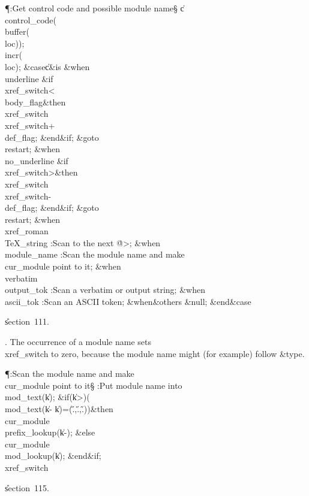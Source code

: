 \Y\P\?\4:Get control code and possible module name\X\S\?\6
\|c\?\K\?\\{control\_code}\?\1(\?\\{buffer}\?\1(\?\\{loc}\?\2)\2)\?;\5
\\{incr}\?\1(\?\\{loc}\?\2)\?;\6
\&{case}\1\8\|c\1\8\&{is}\8\6
\4\&{when}\8\\{underline}\KR\6
\&{if}\1\1\8\\{xref\_switch}\?<\?\\{body\_flag}\2\8\&{then}\6
\\{xref\_switch}\?\K\?\\{xref\_switch}\?+\?\\{def\_flag};\2\6
\&{end}\8\2\&{if}\1;\6
\&{goto}\8\\{restart};\6
\4\&{when}\8\\{no\_underline}\KR\6
\&{if}\1\1\8\\{xref\_switch}\?>\2\8\&{then}\6
\\{xref\_switch}\?\K\?\\{xref\_switch}\?-\?\\{def\_flag};\2\6
\&{end}\8\2\&{if}\1;\6
\&{goto}\8\\{restart};\6
\4\&{when}\8\\{xref\_roman}\?\to\?\\{TeX\_string}\KR\6
:Scan to the next \.{@>}\X;\6
\4\&{when}\8\\{module\_name}\KR\6
:Scan the module name and make \\{cur\_module} point to it\X;\6
\4\&{when}\8\\{verbatim}\?\mathrel{\.|}\?\\{output\_tok}\KR\6
:Scan a verbatim or output string\X;\6
\4\&{when}\8\\{ascii\_tok}\KR\6
:Scan an ASCII token\X;\6
\4\&{when}\8\&{others}\8\KR\6
\&{null};\2\6
\4\2\&{end}\8\&{case}\par
\U section~111.\fi

. The occurrence of a module name sets \\{xref\_switch} to zero,
because the module name might (for example) follow \&{type}.

\Y\P\?\4:Scan the module name and make \\{cur\_module} point to it\X\S\?\6
:Put module name into \\{mod\_text}\?(\?\to\?\|k\?)\?\X;\6
\&{if}\1\1\?\8\1(\?\|k\?>\?\2)\ANT\1(\?\\{mod\_text}\?\1(\?\|k\?-\?\to\?%
\|k\?\2)=\1(\?\H{.}\?,\?\H{.}\?,\?\H{.}\?\2)\2)\?\2\8\&{then}\6
\\{cur\_module}\?\K\?\\{prefix\_lookup}\?\1(\?\|k\?-\?\2)\?;\6
\4\&{else}\6
\\{cur\_module}\?\K\?\\{mod\_lookup}\?\1(\?\|k\?\2)\?;\2\6
\&{end}\8\2\&{if}\1;\6
\\{xref\_switch}\?\K{}\par
\U section~115.\fi

